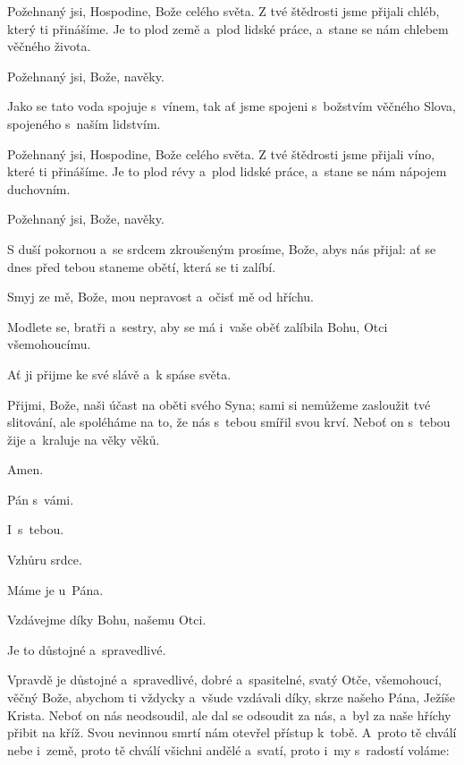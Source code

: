 \mbox{}

Požehnaný jsi, Hospodine, Bože celého světa. Z tvé štědrosti jsme přijali chléb, který ti přinášíme. Je to plod země a~plod lidské práce, a~stane se nám chlebem věčného života.

\Rbardot{} Požehnaný jsi, Bože, navěky.

Jako se tato voda spojuje s~vínem, tak ať jsme spojeni s~božstvím věčného Slova, spojeného s~naším lidstvím.

Požehnaný jsi, Hospodine, Bože celého světa. Z tvé štědrosti jsme přijali víno, které ti přinášíme. Je to plod révy a~plod lidské práce, a~stane se nám nápojem duchovním.

\Rbardot{} Požehnaný jsi, Bože, navěky.

\mbox{}

S duší pokornou a~se srdcem zkroušeným prosíme, Bože, abys nás přijal: ať se dnes před tebou staneme obětí, která se ti zalíbí.

Smyj ze mě, Bože, mou nepravost a~očisť mě od hříchu.

\mbox{}

Modlete se, bratři a~sestry, aby se má i~vaše oběť zalíbila Bohu, Otci všemohoucímu.

\Rbardot{} Ať ji přijme ke své slávě a~k spáse světa.

\mbox{}

Přijmi, Bože, naši účast na oběti svého Syna; sami si nemůžeme zasloužit tvé slitování, ale spoléháme na to, že nás s~tebou smířil svou krví. Neboť on s~tebou žije a~kraluje na věky věků.

\Rbardot{} Amen.

\Vbardot{} Pán s~vámi.

\Rbardot{} I~s~tebou.

\Vbardot{} Vzhůru srdce.

\Rbardot{} Máme je u~Pána.

\Vbardot{} Vzdávejme díky Bohu, našemu Otci.

\Rbardot{} Je to důstojné a~spravedlivé.

\mbox{}

Vpravdě je důstojné a~spravedlivé, dobré a~spasitelné, svatý Otče, všemohoucí, věčný Bože, abychom ti vždycky a~všude vzdávali díky, skrze našeho Pána, Ježíše Krista. Neboť on nás neodsoudil, ale dal se odsoudit za nás, a~byl za naše hříchy přibit na kříž. Svou nevinnou smrtí nám otevřel přístup k~tobě. A~proto tě chválí nebe i~země, proto tě chválí všichni andělé a~svatí, proto i~my s~radostí voláme:
